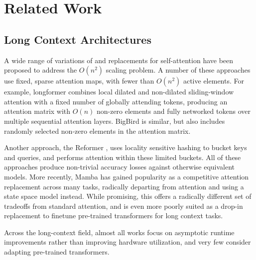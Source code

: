 \section{Related Work}
\subsection{Long Context Architectures}
A wide range of variations of and replacements for self-attention have been proposed to address the $O(n^2)$ scaling problem.  A number of these approaches use fixed, sparse attention maps, with fewer than $O(n^2)$ active elements.  For example, longformer \cite{longformer} combines local dilated and non-dilated sliding-window attention with a fixed number of globally attending tokens, producing an attention matrix with $O(n)$ non-zero elements and fully networked tokens over multiple sequential attention layers.  BigBird \cite{bigbird} is similar, but also includes randomly selected non-zero elements in the attention matrix. \par Another approach, the Reformer \cite{reformer}, uses locality sensitive hashing to bucket keys and queries, and performs attention within these limited buckets.  All of these approaches produce non-trivial accuracy losses against otherwise equivalent models.  More recently, Mamba \cite{mamba} has gained popularity as a competitive attention replacement across many tasks, radically departing from attention and using a state space model instead.  While promising, this offers a radically different set of tradeoffs from standard attention, and is even more poorly suited as a drop-in replacement to finetune pre-trained transformers for long context tasks.  
\par Across the long-context field, almost all works focus on asymptotic runtime improvements rather than improving hardware utilization, and very few consider adapting pre-trained transformers.

